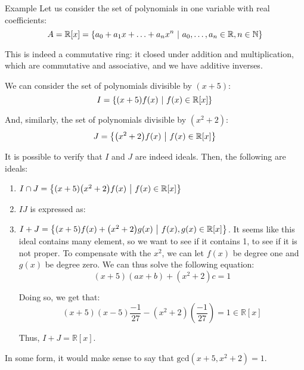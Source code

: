 \documentclass[a4paper]{article}
\begin{document}
\begin{parag}{Example}
    Let us consider the set of polynomials in one variable with real coefficients: 
    \[A = \mathbb{R}\left[x\right] = \left\{a_0 + a_1 x + \ldots + a_n x^n \suchthat a_0, \ldots, a_n \in \mathbb{R}, n \in \mathbb{N}\right\}\]
   
    This is indeed a commutative ring: it closed under addition and multiplication, which are commutative and associative, and we have additive inverses.

    We can consider the set of polynomials divisible by $\left(x+5\right)$: 
    \[I = \left\{\left(x+5\right)f\left(x\right) \suchthat f\left(x\right) \in \mathbb{R}\left[x\right]\right\}\]

    And, similarly, the set of polynomials divisible by $\left(x^2 + 2\right)$: 
    \[J = \left\{\left(x^2 + 2\right) f\left(x\right) \suchthat f\left(x\right) \in \mathbb{R}\left[x\right]\right\}\]
    
    It is possible to verify that $I$ and $J$ are indeed ideals. Then, the following are ideals:
    \begin{enumerate}
        \item $I \cap J = \left\{\left(x + 5\right)\left(x^2 + 2\right)f\left(x\right) \suchthat f\left(x\right) \in \mathbb{R}\left[x\right]\right\}$
        \item $IJ$ is expressed as:

        \item $I + J = \left\{\left(x + 5\right)f\left(x\right) + \left(x^2 + 2\right)g\left(x\right) \suchthat f\left(x\right), g\left(x\right) \in \mathbb{R}\left[x\right]\right\}$. It seems like this ideal contains many element, so we want to see if it contains 1, to see if it is not proper. To compensate with the $x^2$, we can let $f\left(x\right)$ be degree one and $g\left(x\right)$ be degree zero. We can thus solve the following equation: 
        \[\left(x+5\right)\left(ax + b\right) + \left(x^2 + 2\right)c = 1\]
        
        Doing so, we get that: 
        \[\left(x + 5\right)\left(x-5\right)\frac{-1}{27} - \left(x^2 + 2\right)\left(\frac{-1}{27}\right) =  1 \in \mathbb{R}\left[x\right]\]
        
        Thus, $I + J = \mathbb{R}\left[x\right]$.
    \end{enumerate}

    In some form, it would make sense to say that $\text{gcd}\left(x+5, x^2 + 2\right) = 1$.
\end{parag}
\end{document}
